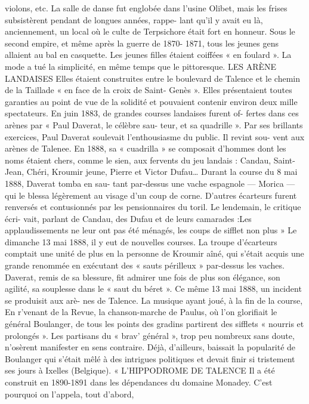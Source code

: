 \documentclass[a4paper,11pt]{book}
\begin{document}
violons, etc.
La salle de danse fut englobée dans l'usine Olibet, mais
les frises subsistèrent pendant de longues années, rappe-
lant qu'il y avait eu là, anciennement, un local où le culte
de Terpsichore était fort en honneur.
Sous le second empire, et même après la guerre de 1870-
1871, tous les jeunes gens allaient au bal en casquette. Les
jeunes filles étaient coiffées « en foulard ». La mode a tué la
simplicité, en même temps que le pittoresque.
LES ARÈNE LANDAISES
Elles étaient construites entre le boulevard de Talence
et le chemin de la Taillade « en face de la croix de Saint-
Genès ». Elles présentaient toutes garanties au point de
vue de la solidité et pouvaient contenir environ deux mille
spectateurs.
En juin 1883, de grandes courses landaises furent of-
fertes dans ces arènes par « Paul Daverat, le célèbre sau-
teur, et sa quadrille ». Par ses brillants exercices, Paul
Daverat soulevait l'enthousiasme du public. Il revint sou-
vent aux arènes de Talenee. En 1888, sa « cuadrilla » se
composait d'hommes dont les noms étaient chers, comme
le sien, aux fervents du jeu landais : Candau, Saint-Jean,
Chéri, Kroumir jeune, Pierre et Victor Dufau…
Durant la course du 8 mai 1888, Daverat tomba en sau-
tant par-dessus une vache espagnole — Morica — qui le
blessa légèrement au visage d'un coup de corne.
D'autres écarteurs furent renversés et contusionnés par
les pensionnaires du toril. Le lendemain, le critique écri-
vait, parlant de Candau, des Dufau et de leurs camarades :Les applaudissements ne leur ont pas été ménagés, les
coups de sifflet non plus »
Le dimanche 13 mai 1888, il y eut de nouvelles courses.
La troupe d'écarteurs comptait une unité de plus en la
personne de Kroumir aîné, qui s'était acquis une grande
renommée en exécutant des « sauts périlleux » par-dessus
les vaches. Daverat, remis de sa blessure, fit admirer une
fois de plus son élégance, son agilité, sa souplesse dans
le « saut du béret ».
Ce même 13 mai 1888, un incident se produisit aux arè-
nes de Talence. La musique ayant joué, à la fin de la
course, En r'venant de la Revue, la chanson-marche de
Paulus, où l'on glorifiait le général Boulanger, de tous
les points des gradins partirent des sifflets « nourris et
prolongés ».
Les partisans du « brav' général », trop peu nombreux
sans doute, n'osèrent manifester en sens contraire. Déjà,
d'ailleurs, baissait la popularité de Boulanger qui s'était
mêlé à des intrigues politiques et devait finir si tristement
ses jours à Ixelles (Belgique).
«
L'HIPPODROME DE TALENCE
Il a été construit en 1890-1891 dans les dépendances du
domaine Monadey. C'est pourquoi on l'appela, tout d'abord,
\end{document}
